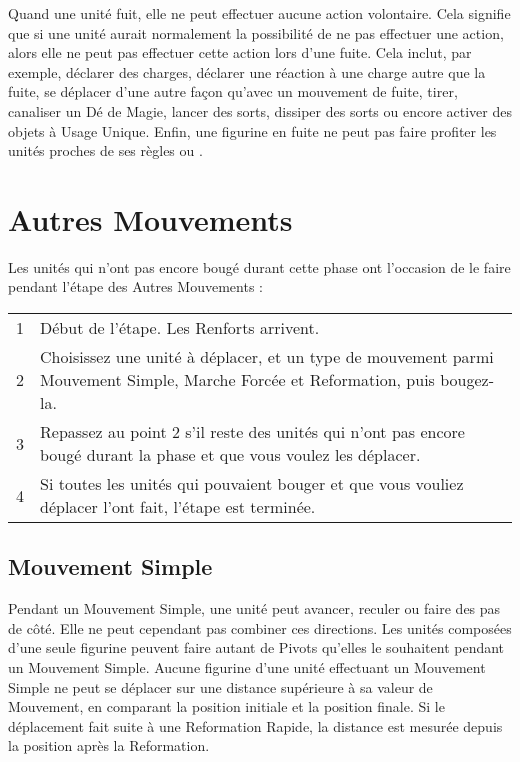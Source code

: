 Quand une unité fuit, elle ne peut effectuer aucune action volontaire. Cela signifie que si une unité aurait normalement la possibilité de ne pas effectuer une action, alors elle ne peut pas effectuer cette action lors d'une fuite. Cela inclut, par exemple, déclarer des charges, déclarer une réaction à une charge autre que la fuite, se déplacer d'une autre façon qu'avec un mouvement de fuite, tirer, canaliser un Dé de Magie, lancer des sorts, dissiper des sorts ou encore activer des objets à Usage Unique. Enfin, une figurine en fuite ne peut pas faire profiter les unités proches de ses règles \inspiringpresence{} ou \holdyourground{}.

\newpage
\hypertarget{remainingmoves}{\section{Autres Mouvements}}

Les unités qui n'ont pas encore bougé durant cette phase ont l'occasion de le faire pendant l'étape des Autres Mouvements :

\hspace*{0.3cm}
\begin{tabular}{c|m{12cm}}
1 & Début de l'étape. Les Renforts arrivent.\tabularnewline
2 & Choisissez une unité à déplacer, et un type de mouvement parmi Mouvement Simple, Marche Forcée et Reformation, puis bougez-la.\tabularnewline
3 & Repassez au point 2 s'il reste des unités qui n'ont pas encore bougé durant la phase et que vous voulez les déplacer.\tabularnewline
4 & Si toutes les unités qui pouvaient bouger et que vous vouliez déplacer l'ont fait, l'étape est terminée.\tabularnewline
\end{tabular}

\hypertarget{advancemove}{\subsection{Mouvement Simple}}

Pendant un Mouvement Simple, une unité peut avancer, reculer ou faire des pas de côté. Elle ne peut cependant pas combiner ces directions. Les unités composées d'une seule figurine peuvent faire autant de Pivots qu'elles le souhaitent pendant un Mouvement Simple. Aucune figurine d'une unité effectuant un Mouvement Simple ne peut se déplacer sur une distance supérieure à sa valeur de Mouvement, en comparant la position initiale et la position finale. Si le déplacement fait suite à une Reformation Rapide, la distance est mesurée depuis la position après la Reformation.

